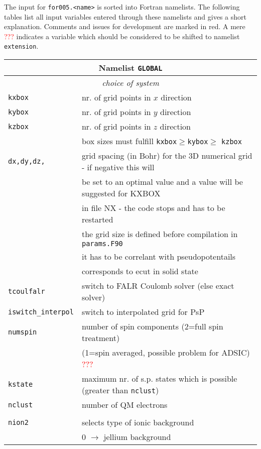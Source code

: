 \documentclass[12pt]{article}
\begin{document}
The input for {\tt for005.<name>} is sorted into Fortran namelists.
The following tables list all input variables entered through these
namelists and gives a short explanation. Comments and issues for
development are marked in red. A mere \textcolor{red}{???} indicates a
variable which should be considered to be shifted to namelist {\tt extension}.
\\
\begin{tabular}{ll}
\hline
\multicolumn{2}{c}{Namelist {\tt GLOBAL}} in {\tt for005.<name>} \\
\hline
\multicolumn{2}{c}{\it choice of system} \\
\hline
{\tt kxbox            }& nr. of grid points in $x$ direction\\
{\tt kybox            }& nr. of grid points in $y$ direction\\
{\tt kzbox            }& nr. of grid points in $z$ direction\\
& box sizes must fulfill {\tt kxbox}$\geq${\tt kybox}$\geq$ {\tt kzbox}\\
{\tt dx,dy,dz,        }& grid spacing (in  Bohr) for the 3D numerical grid - if negative this will \\
&be set to an optimal value and a value will be suggested for KXBOX \\
&in file NX - the code stops and has to be restarted\\
&the grid size is defined before compilation in {\tt params.F90}\\
&it has to be correlant with pseudopotentails\\
&corresponds to ecut in solid state\\
{\tt tcoulfalr} & switch to FALR Coulomb solver (else exact solver)  \\
{\tt iswitch\_interpol} &  switch to interpolated grid for PsP \\
{\tt numspin}          & number of spin components (2=full spin treatment)\\
                       & (1=spin averaged, possible problem for ADSIC)
\textcolor{red}{???}\\
{\tt kstate           }& maximum nr. of s.p. states which is possible (greater than {\tt nclust})\\
{\tt nclust           }& number of QM electrons \\
\\
{\tt nion2            }& selects type of ionic background \\
                       &  0 $\rightarrow$ jellium background \\

\end{tabular}
\end{document}
